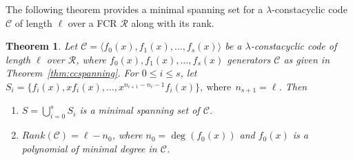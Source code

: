 \documentclass[12pt,a4paper]{article}
\newtheorem{theorem}{Theorem}[section]
\begin{document}
The following theorem provides a minimal spanning set for a $\lambda$-constacyclic code $\mathcal{C}$ of length $\ell$ over a FCR $\mathcal{R}$ along with its rank.
\begin{theorem}\label{thm:rank}
    Let $\mathcal{C}= \langle f_0(x),f_1(x), \dots , f_s(x) \rangle $ be a $\lambda$-constacyclic code of length $\ell$ over $\mathcal{R}$, where $f_0(x),f_1(x), \dots ,f_s(x)$ generators $\mathcal{C}$ as given in Theorem~\ref{thm:ccspanning}. For $0 \le i \le s$, let $S_i=\{ f_i(x), xf_i(x), \ldots, x^{n_{i+1}-n_{i}-1}f_i(x) \}, ~\text{where}~~n_{s+1}=\ell$. Then
    \begin{enumerate}
        \item ${S}=\bigcup_{i=0}^{s}S_i$ is a minimal spanning set of $\mathcal{C}$.
        \item $Rank(\mathcal{C})=\ell-n_0$, where $n_0=\deg(f_0(x))$ and $f_0(x)$ is a polynomial of minimal degree in $\mathcal{C}$.\label{part:rank}
    \end{enumerate}
\end{theorem}
\end{document}
